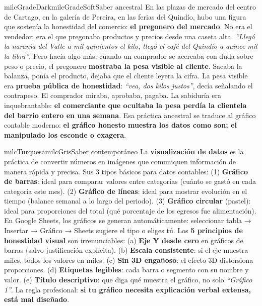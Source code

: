 \documentclass[11pt,letterpaper]{article}
\begin{document}
\begin{softbox}{milcGradeDark}{milcGradeSoft}{Saber ancestral}
En las plazas de mercado del centro de Cartago, en la galería de Pereira, en las ferias del Quindío, hubo una figura que sostenía la honestidad del comercio: \textbf{el pregonero del mercado}. No era el vendedor; era el que pregonaba productos y precios desde una caseta alta. \emph{``Llegó la naranja del Valle a mil quinientos el kilo, llegó el café del Quindío a quince mil la libra''}. Pero hacía algo más: cuando un comprador se acercaba con duda sobre peso o precio, el pregonero \textbf{mostraba la pesa visible al cliente}. Sacaba la balanza, ponía el producto, dejaba que el cliente leyera la cifra. La pesa visible era \textbf{prueba pública de honestidad}: \emph{``vea, dos kilos justos''}, decía señalando el contrapeso. El comprador miraba, aprobaba, pagaba. La sabiduría era inquebrantable: \textbf{el comerciante que ocultaba la pesa perdía la clientela del barrio entero en una semana}. Esa práctica ancestral se traduce al gráfico contable moderno: \textbf{el gráfico honesto muestra los datos como son; el manipulado los esconde o exagera}.
\end{softbox}

\begin{softbox}{milcTurquesa}{milcGris}{Saber contemporáneo}
La \textbf{visualización de datos} es la práctica de convertir números en imágenes que comuniquen información de manera rápida y precisa. Sus 3 tipos básicos para datos contables: (1) \textbf{Gráfico de barras}: ideal para comparar valores entre categorías (cuánto se gastó en cada categoría este mes). (2) \textbf{Gráfico de líneas}: ideal para mostrar evolución en el tiempo (balance semanal a lo largo del periodo). (3) \textbf{Gráfico circular} (pastel): ideal para proporciones del total (qué porcentaje de los egresos fue alimentación). En Google Sheets, los gráficos se generan automáticamente: seleccionar tabla → Insertar → Gráfico → Sheets sugiere el tipo o eliges tú. Los \textbf{5 principios de honestidad visual} son irrenunciables: (a) \textbf{Eje Y desde cero} en gráficos de barras (salvo justificación explícita). (b) \textbf{Escala consistente}: si el eje muestra miles, todos los valores en miles. (c) \textbf{Sin 3D engañoso}: el efecto 3D distorsiona proporciones. (d) \textbf{Etiquetas legibles}: cada barra o segmento con su nombre y valor. (e) \textbf{Título descriptivo}: que diga qué muestra el gráfico, no solo \emph{``Gráfico 1''}. La regla profesional: \textbf{si tu gráfico necesita explicación verbal extensa, está mal diseñado}.
\end{softbox}
\end{document}
